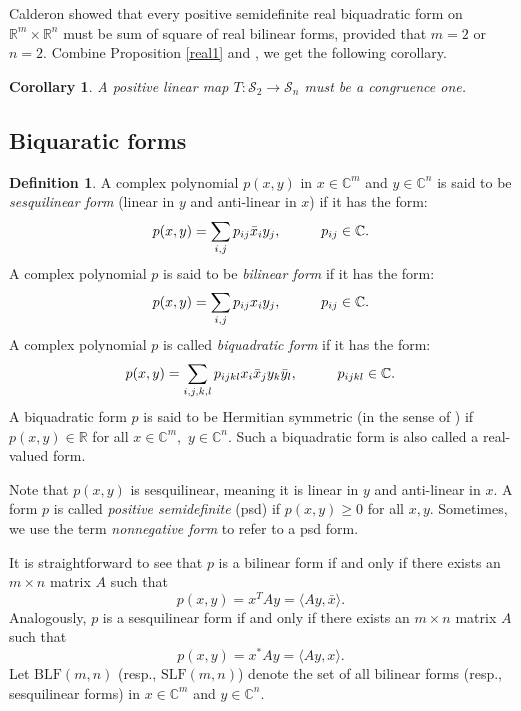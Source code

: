 \documentclass[12pt,a4paper]{amsart}
\theoremstyle{plain}
\newtheorem{corollary}[theorem]{Corollary}
\theoremstyle{remark}
\theoremstyle{definition}
\newtheorem{defn}[theorem]{Definition}
\def \R {\mathbb{R}}
\def \C {\mathbb{C}}
\def \cS {\mathcal{S}}
\begin{document}
Calderon \cite{Calderon} showed that every positive semidefinite real biquadratic form on $\R^m\times \R^n$ must be sum of square of real bilinear forms, provided that $m=2$ or $n=2.$ Combine Proposition \ref{real1} and \cite[Theorem 1]{Calderon}, we get the following corollary.
\begin{corollary}
	A positive linear map $T: \cS_2 \longrightarrow \cS_n$ must be a congruence one.
\end{corollary}
 
\subsection{Biquaratic forms}
\begin{defn}\label{defn1}
	A complex polynomial $p(x,y)$ in $x\in \C^m$ and $y\in \C^n$ is said to be \textit{sesquilinear form} (linear in $y$ and anti-linear in $x$) if it has the form:
	$$
	p(x,y) = \sum_{i,j} p_{ij} \bar{x}_i y_j ,  \hspace{1 cm} p_{ij} \in \C.
	$$ 
	A complex polynomial $p$ is said to be \textit{bilinear form} if it has the form:
	$$
	p(x,y) = \sum_{i,j} p_{ij} x_i y_j  ,\hspace{1 cm} p_{ij} \in \C.
	$$ 
	A complex polynomial $p$ is called \textit{biquadratic form} if it has the form:
	$$
	p(x,y) = \sum_{i,j,k,l} p_{ijkl} x_i\bar{x}_j y_k \bar{y}_l ,  \hspace{1 cm} p_{ijkl} \in \C.
	$$ 
	A biquadratic form $p$ is said to be Hermitian symmetric (in the sense of \cite{A2011}) if $p(x,y) \in \R$ for all $x\in \C^m,$ $y\in \C^n.$  Such a biquadratic form is also called a real-valued form.
\end{defn}
Note that $p(x,y)$ is sesquilinear, meaning it is linear in $y$ and anti-linear in $x$.
A form $p$ is called \textit{positive semidefinite} (psd) if $p(x,y)\ge 0$ for all $x,y.$ Sometimes, we use the term \textit{nonnegative form} to refer to a psd form.

It is straightforward to see that $p$ is a bilinear form if and only if there exists an $m\times n$ matrix $A$ such that
$$
p(x,y) = x^T A y = \langle Ay, \bar{x} \rangle.
$$
Analogously, $p$ is a sesquilinear form if and only if there exists an $m\times n$ matrix $A$ such that
$$
p(x,y) = x^* A y = \langle Ay, x \rangle.
$$
Let $\mathrm{BLF}(m,n)$ (resp., $\mathrm{SLF}(m,n)$) denote the set of all bilinear forms (resp., sesquilinear forms) in $x \in \mathbb{C}^m$ and $y \in \mathbb{C}^n$.
\end{document}
